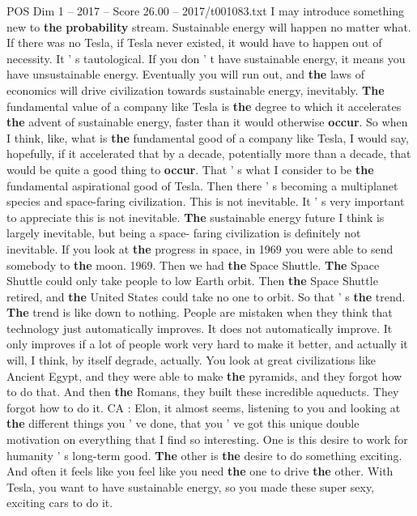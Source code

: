 \begin{textsample}{POS Dim 1 – 2017 – Score 26.00 – 2017/t001083.txt}
I may introduce something new to \textbf{the} \textbf{probability} stream.
Sustainable energy will happen no matter what.
If there was no Tesla, if Tesla never existed, it would have to happen out of necessity.
It ' s tautological.
If you don ' t have sustainable energy, it means you have unsustainable energy.
Eventually you will run out, and \textbf{the} laws of economics will drive civilization towards sustainable energy, inevitably. \textbf{The} fundamental value of a company like Tesla is \textbf{the} degree to which it accelerates \textbf{the} advent of sustainable energy, faster than it would otherwise \textbf{occur}.
So when I think, like, what is \textbf{the} fundamental good of a company like Tesla, I would say, hopefully, if it accelerated that by a decade, potentially more than a decade, that would be quite a good thing to \textbf{occur}.
That ' s what I consider to be \textbf{the} fundamental aspirational good of Tesla.
Then there ' s becoming a multiplanet species and space-faring civilization.
This is not inevitable.
It ' s very important to appreciate this is not inevitable. \textbf{The} sustainable energy future I think is largely inevitable, but being a space- faring civilization is definitely not inevitable.
If you look at \textbf{the} progress in space, in 1969 you were able to send somebody to \textbf{the} moon. 1969.
Then we had \textbf{the} Space Shuttle. \textbf{The} Space Shuttle could only take people to low Earth orbit.
Then \textbf{the} Space Shuttle retired, and \textbf{the} United States could take no one to orbit.
So that ' s \textbf{the} trend. \textbf{The} trend is like down to nothing.
People are mistaken when they think that technology just automatically improves.
It does not automatically improve.
It only improves if a lot of people work very hard to make it better, and actually it will, I think, by itself degrade, actually.
You look at great civilizations like Ancient Egypt, and they were able to make \textbf{the} pyramids, and they forgot how to do that.
And then \textbf{the} Romans, they built these incredible aqueducts.
They forgot how to do it.
CA : Elon, it almost seems, listening to you and looking at \textbf{the} different things you ' ve done, that you ' ve got this unique double motivation on everything that I find so interesting.
One is this desire to work for humanity ' s long-term good. \textbf{The} other is \textbf{the} desire to do something exciting.
And often it feels like you feel like you need \textbf{the} one to drive \textbf{the} other.
With Tesla, you want to have sustainable energy, so you made these super sexy, exciting cars to do it.

\end{textsample}
